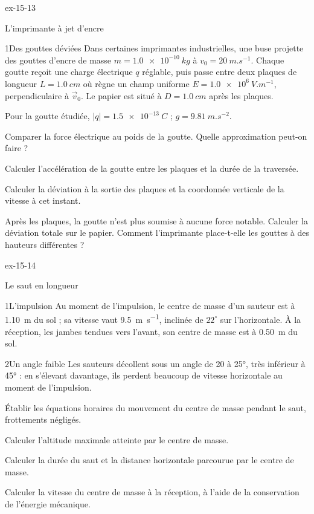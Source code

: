 \begin{blocLivre}{ex-15-13}
\begin{exercice}[3]{L'imprimante à jet d'encre}
\begin{docu}{1}{Des gouttes déviées}
Dans certaines imprimantes industrielles, une buse projette des gouttes d'encre de masse $m=\qty{1,0e-10}{kg}$ à
$v_0=\qty{20}{m.s^{-1}}$. Chaque goutte reçoit une charge électrique $q$ réglable, puis passe entre deux plaques de
longueur $L=\qty{1,0}{cm}$ où règne un champ uniforme $E=\qty{1,0e6}{V.m^{-1}}$, perpendiculaire à $\vec{v}_0$. Le papier est
situé à $D=\qty{1,0}{cm}$ après les plaques.
\end{docu}
\begin{donnees}
Pour la goutte étudiée, $|q|=\qty{1,5e-13}{C}$ ; $g=\qty{9,81}{m.s^{-2}}$.
\end{donnees}
\begin{questions}
\item Comparer la force électrique au poids de la goutte. Quelle approximation peut-on faire ?
\item Calculer l'accélération de la goutte entre les plaques et la durée de la traversée.
\item Calculer la déviation à la sortie des plaques et la coordonnée verticale de la vitesse à cet instant.
\item \initiative Après les plaques, la goutte n'est plus soumise à aucune force notable. Calculer la déviation totale
sur le papier. Comment l'imprimante place-t-elle les gouttes à des hauteurs différentes ?
\end{questions}
\end{exercice}
\end{blocLivre}
\begin{blocLivre}{ex-15-14}
\begin{exercice}[3]{Le saut en longueur}
\begin{docu}{1}{L'impulsion}
Au moment de l'impulsion, le centre de masse d'un sauteur est à \qty{1,10}{m} du sol ; sa vitesse vaut
\qty{9,5}{m.s^{-1}}, inclinée de $22^\circ$ sur l'horizontale. À la réception, les jambes tendues vers l'avant, son centre de
masse est à \qty{0,50}{m} du sol.
\end{docu}
\begin{docu}{2}{Un angle faible}
Les sauteurs décollent sous un angle de 20 à 25°, très inférieur à 45° : en s'élevant davantage, ils perdent beaucoup de
vitesse horizontale au moment de l'impulsion.
\end{docu}
\begin{questions}
\item Établir les équations horaires du mouvement du centre de masse pendant le saut, frottements négligés.
\item Calculer l'altitude maximale atteinte par le centre de masse.
\item \initiative Calculer la durée du saut et la distance horizontale parcourue par le centre de masse.
\item Calculer la vitesse du centre de masse à la réception, à l'aide de la conservation de l'énergie mécanique.
\end{questions}
\end{exercice}
\end{blocLivre}

